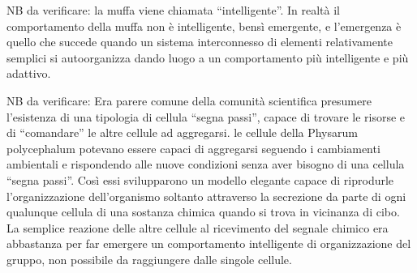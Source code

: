 NB da verificare: la muffa viene chiamata “intelligente”. In realtà il comportamento della muffa non è intelligente, bensì emergente, e l’emergenza è quello che succede quando un sistema interconnesso di elementi relativamente semplici si autoorganizza dando luogo a un comportamento più intelligente e più adattivo.

NB da verificare: Era parere comune della comunità scientifica presumere l’esistenza di una tipologia di cellula “segna passi”, capace di trovare le risorse e di “comandare” le altre cellule ad aggregarsi. le cellule della Physarum polycephalum potevano essere capaci di aggregarsi seguendo i cambiamenti ambientali e rispondendo alle nuove condizioni senza aver bisogno di una cellula “segna passi”. Così essi svilupparono un modello elegante capace di riprodurle l’organizzazione dell’organismo soltanto attraverso la secrezione da parte di ogni qualunque cellula di una sostanza chimica quando si trova in vicinanza di cibo. La semplice reazione delle altre cellule al ricevimento del segnale chimico era abbastanza per far emergere un comportamento intelligente di organizzazione del gruppo, non possibile da raggiungere dalle singole cellule. 

